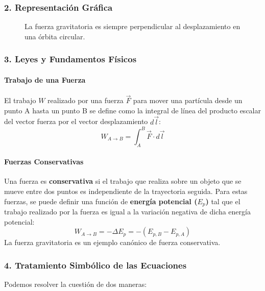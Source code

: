 \subsubsection*{2. Representación Gráfica}
\begin{figure}[H]
    \centering
    \caption{La fuerza gravitatoria es siempre perpendicular al desplazamiento en una órbita circular.}
\end{figure}

\subsubsection*{3. Leyes y Fundamentos Físicos}
\paragraph*{Trabajo de una Fuerza}
El trabajo $W$ realizado por una fuerza $\vec{F}$ para mover una partícula desde un punto A hasta un punto B se define como la integral de línea del producto escalar del vector fuerza por el vector desplazamiento $d\vec{l}$:
$$ W_{A \to B} = \int_{A}^{B} \vec{F} \cdot d\vec{l} $$
\paragraph*{Fuerzas Conservativas}
Una fuerza es \textbf{conservativa} si el trabajo que realiza sobre un objeto que se mueve entre dos puntos es independiente de la trayectoria seguida. Para estas fuerzas, se puede definir una función de \textbf{energía potencial ($E_p$)} tal que el trabajo realizado por la fuerza es igual a la variación negativa de dicha energía potencial:
$$ W_{A \to B} = -\Delta E_p = -(E_{p,B} - E_{p,A}) $$
La fuerza gravitatoria es un ejemplo canónico de fuerza conservativa.

\subsubsection*{4. Tratamiento Simbólico de las Ecuaciones}
Podemos resolver la cuestión de dos maneras:
